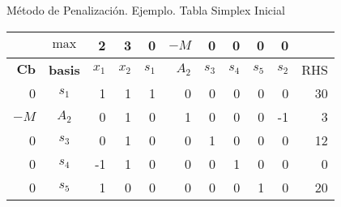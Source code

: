 \begin{frame}{Método de Penalización. Ejemplo.}{}
  Tabla Simplex Inicial

  {\centering
    \begin{tabular}{rc|rr|rrrrrr|r}
      & $\max$ & 2 & 3 & 0 & $-M$ & 0 & 0 & 0 & 0 &  \\
      \toprule
      $\mathbf{Cb}$ & \textbf{basis} & $x_1$ & $x_2$ & $s_1$ & $A_2$ & $s_3$ & $s_4$ & $s_5$ & $s_2$ & RHS \\
      \toprule
      0 & $s_1$ & 1 & 1 & 1 & 0 & 0 & 0 & 0 & 0 & 30 \\
      $-M$ & $A_2$ & 0 & 1 & 0 & 1 & 0 & 0 & 0 & -1 & 3 \\
      0 & $s_3$ & 0 & 1 & 0 & 0 & 1 & 0 & 0 & 0 & 12 \\
      0 & $s_4$ & -1 & 1 & 0 & 0 & 0 & 1 & 0 & 0 & 0 \\
      0 & $s_5$ & 1 & 0 & 0 & 0 & 0 & 0 & 1 & 0 & 20\\
      \bottomrule
    \end{tabular}
    \par}

\end{frame}

